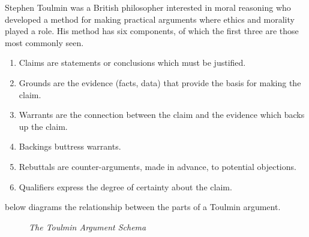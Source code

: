 Stephen Toulmin was a British philosopher interested in moral reasoning who developed a method for making practical arguments where ethics and morality played a role. His method has six components, of which the first three are those most commonly seen.
\begin{enumerate}[topsep=0.3\baselineskip,itemsep=0.25\baselineskip]
  \item Claims are statements or conclusions which must be justified.
  \item Grounds are the evidence (facts, data) that provide the basis for making the claim.
  \item Warrants are the connection between the claim and the evidence which backs up the claim.
  \item Backings buttress warrants.
  \item Rebuttals are counter-arguments, made in advance, to potential objections.
  \item Qualifiers express the degree of certainty about the claim.
\end{enumerate}

 below diagrams the relationship between the parts of a Toulmin argument.

\begin{figure}[htbp]
  \caption{\textit{The Toulmin Argument Schema}}\label{fig:toulmin-arg}%
  \centering%
\end{figure}

